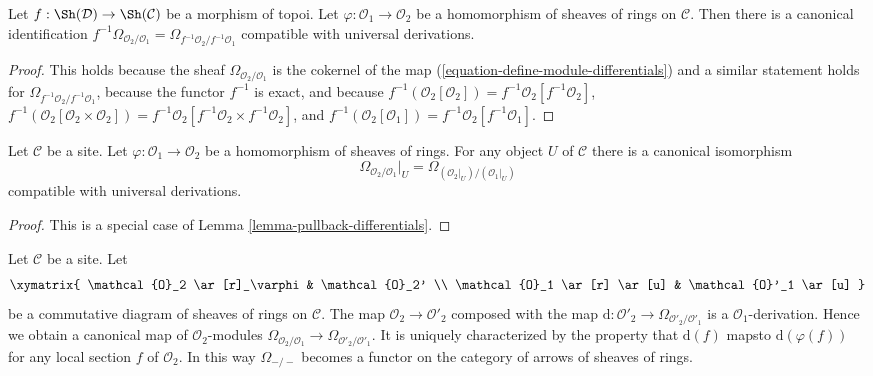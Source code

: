 \begin{lemma}
\label{lemma-pullback-differentials}
Let $f : \Sh(\mathcal{D}) \to \Sh(\mathcal{C})$ be a morphism of topoi.
Let $\varphi : \mathcal{O}_1 \to \mathcal{O}_2$
be a homomorphism of sheaves of rings on $\mathcal{C}$.
Then there is a canonical identification
$f^{-1}\Omega_{\mathcal{O}_2/\mathcal{O}_1} =
\Omega_{f^{-1}\mathcal{O}_2/f^{-1}\mathcal{O}_1}$
compatible with universal derivations.
\end{lemma}

\begin{proof}
This holds because the sheaf $\Omega_{\mathcal{O}_2/\mathcal{O}_1}$
is the cokernel of the map (\ref{equation-define-module-differentials})
and a similar statement holds for
$\Omega_{f^{-1}\mathcal{O}_2/f^{-1}\mathcal{O}_1}$,
because the functor $f^{-1}$ is exact, and because
$f^{-1}(\mathcal{O}_2[\mathcal{O}_2]) =
f^{-1}\mathcal{O}_2[f^{-1}\mathcal{O}_2]$,
$f^{-1}(\mathcal{O}_2[\mathcal{O}_2 \times \mathcal{O}_2]) =
f^{-1}\mathcal{O}_2[f^{-1}\mathcal{O}_2 \times f^{-1}\mathcal{O}_2]$, and
$f^{-1}(\mathcal{O}_2[\mathcal{O}_1]) =
f^{-1}\mathcal{O}_2[f^{-1}\mathcal{O}_1]$.
\end{proof}

\begin{lemma}
\label{lemma-localize-differentials}
Let $\mathcal{C}$ be a site. Let $\varphi : \mathcal{O}_1 \to \mathcal{O}_2$
be a homomorphism of sheaves of rings. For any object $U$ of $\mathcal{C}$
there is a canonical isomorphism
$$
\Omega_{\mathcal{O}_2/\mathcal{O}_1}|_U =
\Omega_{(\mathcal{O}_2|_U)/(\mathcal{O}_1|_U)}
$$
compatible with universal derivations.
\end{lemma}

\begin{proof}
This is a special case of Lemma \ref{lemma-pullback-differentials}.
\end{proof}

\begin{lemma}
\label{lemma-functoriality-differentials}
Let $\mathcal{C}$ be a site. Let
$$
\xymatrix{
\mathcal{O}_2 \ar[r]_\varphi & \mathcal{O}_2' \\
\mathcal{O}_1 \ar[r] \ar[u] & \mathcal{O}'_1 \ar[u]
}
$$
be a commutative diagram of sheaves of rings on $\mathcal{C}$. The map
$\mathcal{O}_2 \to \mathcal{O}'_2$ composed with the map
$\text{d} : \mathcal{O}'_2 \to \Omega_{\mathcal{O}'_2/\mathcal{O}'_1}$
is a $\mathcal{O}_1$-derivation. Hence we obtain a canonical map of
$\mathcal{O}_2$-modules
$\Omega_{\mathcal{O}_2/\mathcal{O}_1} \to
\Omega_{\mathcal{O}'_2/\mathcal{O}'_1}$.
It is uniquely characterized by the property that
$\text{d}(f)$ mapsto $\text{d}(\varphi(f))$
for any local section $f$ of $\mathcal{O}_2$.
In this way $\Omega_{-/-}$ becomes a functor on the category
of arrows of sheaves of rings.
\end{lemma}

